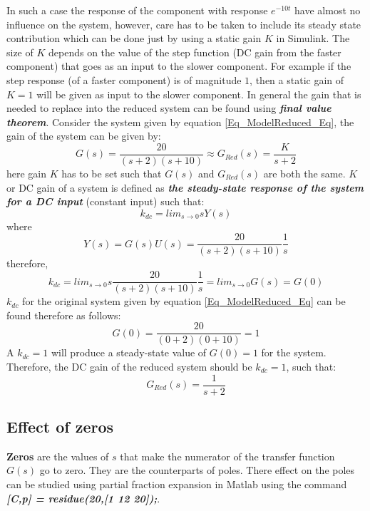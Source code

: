 In such a case the response of the component with response $e^{-10t}$ have almost no influence on the system, however, care has to be taken to include its steady state contribution which can be done just by using a static gain $K$ in Simulink. The size of $K$ depends on the value of the step function (DC gain from the faster component) that goes as an input to the slower component. For example if the step response (of a faster component) is of magnitude $1$, then a static gain of $K = 1$ will be given as input to the slower component. In general the gain that is needed to replace into the reduced system can be found using \textbf{\textit{final value theorem}}. Consider the system given by equation \eqref{Eq_ModelReduced_Eq}, the gain of the system can be given by:
\begin{equation}
	G(s) = \frac{20}{(s+2)(s+10)} \approx G_{Red}(s) = \frac{K}{s+2}
\end{equation}
here gain $K$ has to be set such that $G(s)$ and $G_{Red}(s)$ are both the same. $K$ or DC gain of a system is defined as \textbf{\textit{the steady-state response of the system for a DC input}} (constant input) such that:
\begin{equation}
	k_{dc} = lim_{s \rightarrow 0} s Y(s)
\end{equation}
where $$Y(s) = G(s)U(s) = \frac{20}{(s+2)(s+10)} \frac{1}{s}$$
therefore,
$$ k_{dc} = lim_{s \rightarrow 0} s \frac{20}{(s+2)(s+10)} \frac{1}{s} = lim_{s \rightarrow 0} G(s) = G(0) $$
$k_{dc}$ for the original system given by equation \eqref{Eq_ModelReduced_Eq} can be found therefore as follows:
\begin{equation}
	G(0) = \frac{20}{(0+2)(0+10)} = 1
\end{equation}
A $k_{dc} = 1$ will produce a steady-state value of $G(0) = 1$ for the system. Therefore, the DC gain of the reduced system should be $k_{dc} = 1$, such that:
\begin{equation}
	G_{Red}(s) = \frac{1}{s+2}
\end{equation}

\subsection{Effect of zeros}

\textbf{Zeros} are the values of $s$ that make the numerator of the transfer function $G(s)$ go to zero. They are the counterparts of poles. There effect on the poles can be studied using partial fraction expansion in Matlab using the command \textbf{\textit{[C,p] = residue(20,[1 12 20]);}}. 
